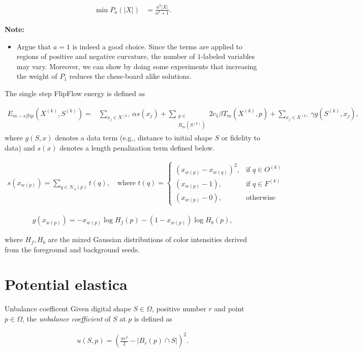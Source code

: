 \begin{align*}
	\min P_a(|X|) &= \frac{a^2|X|}{a^2+1}.
\end{align*}

\textbf{Note:} 
\begin{itemize}
	\item{Argue that $a=1$ is indeed a good choice. Since the terms are applied to regions of positive and negative curvature, the number of $1$-labeled variables may vary. Moreover, we can show by doing some experiments that increasing the weight of $P_1$ reduces the chess-board alike solutions. }
\end{itemize}

The single step FlipFlow energy is defined as

\begin{align}
  E_{m-sflip}(X^{(k)},S^{(k)}) =& \sum_{x_j \in X^{(k)}}{\alpha s(x_j)} + \sum_{ \substack{p \in \\ R_m(S^{(k)})}}{ 2c_1 \beta  T_m(X^{(k)},p) }+ \sum_{x_j \in X^{(k)}}{\gamma g(S^{(k)},x_j)},
  \label{eq:single-step-energy-family}
\end{align}
where $g(S,x)$ denotes a data term (e.g., distance to initial shape $S$ or fidelity to data) and $s(x)$ denotes a length penalization term defined below.

\begin{align}
  s(x_{w(p)})=\sum_{q \in \mathcal{N}_4(p)}{ t(q) }, \quad \text{where } t(q) = \left\{\begin{array}{ll}
  (x_{w(p)}-x_{w(q)})^2, & \text{if } q \in O^{(k)}\\
  (x_{w(p)}-1), & \text{if } q \in F^{(k)}\\
  (x_{w(p)}-0), & \text{otherwise }
  \end{array}\right.
  \label{eq:length-penalization}
\end{align}

\begin{align}
  g(x_{w(p)}) = -x_{w(p)}\log{H_f(p)} - (1-x_{w(p)})\log{H_b(p)},
  \label{eq:data-fidelity}
\end{align}	

where $H_f ,H_b $ are the mixed Gaussian distributions of color intensities derived from the foreground and background seeds.

\section{Potential elastica}

\begin{definition}{Unbalance coefficent}
Given digital shape $S \in \Omega$, positive number $r$ and point $p \in \Omega$, the \emph{unbalance coefficient} of $S$ at $p$ is defined as

\begin{align*}
	u(S,p) = \left( \frac{\pi r^2}{2} - |B_r(p) \cap S| \right)^2.
\end{align*}

\end{definition}

